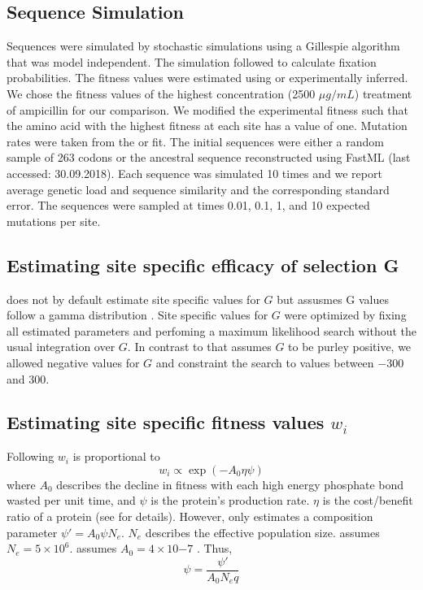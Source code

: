 \subsection{Sequence Simulation}

Sequences were simulated by stochastic simulations using a Gillespie algorithm \citep{gillespie1976} that was model independent.
The simulation followed \citet{SellaAndHirsh2005} to calculate fixation probabilities.
The fitness values were estimated using \selac or experimentally inferred.
We chose the fitness values of the highest concentration (2500 $\mu g/mL$) treatment of ampicillin for our comparison.
We modified the experimental fitness such that the amino acid with the highest fitness at each site has a value of one.
Mutation rates were taken from the \selac or \selacDMS fit.
The initial sequences were either a random sample of 263 codons or the ancestral sequence reconstructed using FastML \citep{fastml} (last accessed: 30.09.2018).
Each sequence was simulated 10 times and we report average genetic load and sequence similarity and the corresponding standard error.
The sequences were sampled at times 0.01, 0.1, 1, and 10 expected mutations per site.

\subsection{Estimating site specific efficacy of selection G}

\selac does not by default estimate site specific values for $G$ but assusmes G values follow a gamma distribution \citep{Felsenstein2001}.
Site specific values for $G$ were optimized by fixing all estimated parameters and perfoming a maximum likelihood search without the usual integration over $G$.
In contrast to \selac that assumes $G$ to be purley positive, we allowed negative values for $G$ and constraint the search to values between $-300$ and $300$.

\subsection{Estimating site specific fitness values $w_i$}

Following \citet{beaulieu2018} $w_i$ is proportional to
\begin{equation}
w_i \propto \exp(-A_0\eta\psi)
\end{equation}
where $A_0$ describes the decline in fitness with each high energy phosphate bond wasted per unit time, and $\psi$ is the protein's production rate.
$\eta$ is the cost/benefit ratio of a protein (see \citep{beaulieu2018} for details). 
However, \selac only estimates a composition parameter $\psi' = A_0\psi N_e$.
$N_e$ describes the effective population size.
\selac assumes $N_e = 5\times 10^6$.
\selac assumes $A_0 = 4 \times 10{-7}$ \citep{gilchrist2007}.
Thus, 
\begin{equation}
\psi = \frac{\psi'}{A_0N_eq}
\end{equation}


